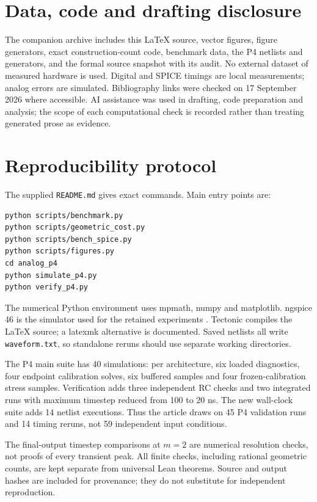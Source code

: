 \documentclass[11pt,a4paper]{article}
\theoremstyle{remark}\newtheorem{remark}[theorem]{Remark}
\numberwithin{equation}{section}
\begin{document}
\section*{Data, code and drafting disclosure}
The companion archive includes this LaTeX source, vector figures, figure generators, exact construction-count code, benchmark data, the P4 netlists and generators, and the formal source snapshot with its audit. No external dataset of measured hardware is used. Digital and SPICE timings are local measurements; analog errors are simulated. Bibliography links were checked on 17 September 2026 where accessible. AI assistance was used in drafting, code preparation and analysis; the scope of each computational check is recorded rather than treating generated prose as evidence.

\appendix
\section{Reproducibility protocol}\label{app:repro}
The supplied \texttt{README.md} gives exact commands. Main entry points are:
\begin{lstlisting}
python scripts/benchmark.py
python scripts/geometric_cost.py
python scripts/bench_spice.py
python scripts/figures.py
cd analog_p4
python simulate_p4.py
python verify_p4.py
\end{lstlisting}
The numerical Python environment uses mpmath, numpy and matplotlib. ngspice 46 is the simulator used for the retained experiments \citep{ngspice}. Tectonic compiles the LaTeX source; a latexmk alternative is documented. Saved netlists all write \texttt{waveform.txt}, so standalone reruns should use separate working directories.

The P4 main suite has 40 simulations: per architecture, six loaded diagnostics, four endpoint calibration solves, six buffered samples and four frozen-calibration stress samples. Verification adds three independent RC checks and two integrated runs with maximum timestep reduced from 100 to 20 ns. The new wall-clock suite adds 14 netlist executions. Thus the article draws on 45 P4 validation runs and 14 timing reruns, not 59 independent input conditions.

The final-output timestep comparisons at $m=2$ are numerical resolution checks, not proofs of every transient peak. All finite checks, including rational geometric counts, are kept separate from universal Lean theorems. Source and output hashes are included for provenance; they do not substitute for independent reproduction.
\end{document}
